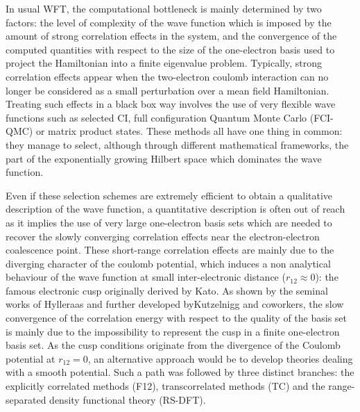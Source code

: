 \documentclass[aip,jcp,reprint,noshowkeys,superscriptaddress]{revtex4-1}
\begin{document}
In usual WFT, the computational bottleneck is mainly determined by two factors: the level of complexity of the wave function which is imposed by the amount of strong correlation effects in the system, and the convergence of the computed quantities with respect to the size of the one-electron basis used to project the Hamiltonian into a finite eigenvalue problem. 
Typically, strong correlation effects appear when the two-electron coulomb interaction can no longer be considered as a small perturbation over a mean field Hamiltonian. Treating such effects in a black box way involves the use of very flexible wave functions such as 
selected CI\cite{bender,HurMalRan-JCP-73,buenker1,buenker-book,three_class_CIPSI,harrison,cele_cipsi_3_spaces,cele_cipsi_zeroth_order,GinSceCaf-CJC-13, GinSceCaf-JCP-15, ShaHolJeaAlaUmr-JCTC-17}, 
full configuration Quantum Monte Carlo\cite{BooThoAla-JCP-09,BooAla-JCP-10,BooCleThoAla-JCP-11,GhaLozAla-JCP-19,VitAlaKat-JCTC-20} (FCI-QMC) or matrix product states\cite{ChaSha-AR-11,BaiRei-JCP-20}. These methods all have one thing in common: they manage to select, although through different mathematical frameworks, the part of the exponentially growing Hilbert space which dominates the wave function. 

Even if these selection schemes are extremely efficient to obtain a qualitative description of the wave function, a quantitative description is often out of reach as it implies the use of very large one-electron basis sets which are needed to recover the slowly converging correlation effects near the electron-electron coalescence point. 
These short-range correlation effects are mainly due to the diverging character of the coulomb potential, which induces a non analytical behaviour of the wave function at small inter-electronic distance ($r_{12}\approx 0$): the famous electronic cusp originally derived by Kato\cite{Kat-CPAM-57}. As shown by the seminal works of Hylleraas \cite{Hyl-ZP-29} and further developed byKutzelnigg and coworkers, \cite{Kut-TCA-85,KutKlo-JCP-91, NogKut-JCP-94} the slow convergence of the correlation energy with respect to the quality of the basis set is mainly due to the impossibility to represent the cusp in a finite one-electron basis set. 
As the cusp conditions originate from the divergence of the Coulomb potential at $r_{12}=0$, an alternative approach would be to develop theories dealing with a smooth potential. Such a path was followed by three distinct branches: 
the explicitly correlated methods (F12), transcorrelated methods (TC) and the range-separated density functional theory (RS-DFT). 
\end{document}
